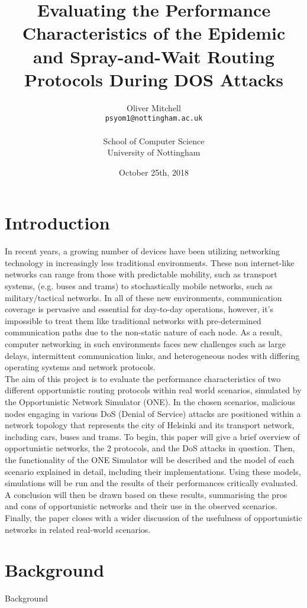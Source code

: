 \documentclass{article}
\title{Evaluating the Performance Characteristics of the Epidemic and Spray-and-Wait Routing Protocols During DOS Attacks}
\author{
  Oliver Mitchell\\
  \texttt{psyom1@nottingham.ac.uk}\\\\
  \textnormal{School of Computer Science}\\
  \textnormal{University of Nottingham}
}
\date{October 25th, 2018}
\begin{document}
\maketitle
 
\tableofcontents
\newpage

\section{Introduction}

In recent years, a growing number of devices have been utilizing networking technology in increasingly less traditional environments. These non internet-like networks can range from those with predictable mobility, such as transport systems, (e.g. buses and trams) to stochastically mobile networks, such as military/tactical networks. In all of these new environments, communication coverage is pervasive and essential for day-to-day operations, however, it's impossible to treat them like traditional networks with pre-determined communication paths due to the non-static nature of each node. As a result, computer networking in such environments faces new challenges such as large delays, intermittent communication links, and heterogeneous nodes with differing operating systems and network protocols.\\

\noindent The aim of this project is to evaluate the performance characteristics of two different opportunistic routing protocols within real world scenarios, simulated by the Opportunistic Network Simulator (ONE). In the chosen scenarios, malicious nodes engaging in various DoS (Denial of Service) attacks are positioned within a network topology that represents the city of Helsinki and its transport network, including cars, buses and trams.
To begin, this paper will give a brief overview of opportunistic networks, the 2 protocols, and the DoS attacks in question. Then, the functionality of the ONE Simulator will be described and the model of each scenario explained in detail, including their implementations. Using these models, simulations will be run and the results of their performances critically evaluated. A conclusion will then be drawn based on these results, summarising the pros and cons of opportunistic networks and their use in the observed scenarios. Finally, the paper closes with a wider discussion of the usefulness of opportunistic networks in related real-world scenarios.
 
\section{Background}
Background
\end{document}
